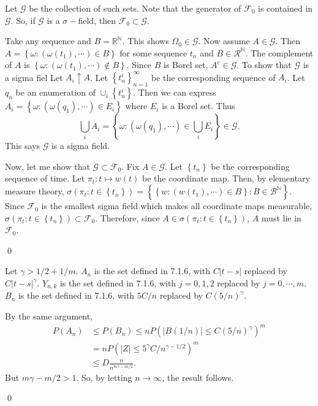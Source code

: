 \begin{problem}[7.1.4] \hfill

	Let $\mathcal{G}$ be the collection of such sets.
	Note that the generator of $\mathcal{F}_0$ is contained in $\mathcal{G}$.
	So, if $\mathcal{G}$ is a $\sigma-$field, then $\mathcal{F}_0 \subset \mathcal{G}$.
	
	Take any sequence and $B = \mathbb{R}^{\mathbb{N}}$.
	This shows $\Omega_0 \in \mathcal{G}$.
	Now assume $A \in \mathcal{G}$.
	Then $A = \left\{ \omega: (\omega(t_1), \cdots ) \in B \right\}$ for some sequence $t_n$ and $B \in \mathcal{R}^{\mathbb{N}}$.
	The complement of $A$ is $\left\{ \omega: \left( \omega(t_1), \cdots \right) \notin B \right\}$.
	Since $B$ is Borel set, $A^c \in \mathcal{G}$.
	To show that $\mathcal{G}$ is a sigma fiel
	Let $A_i \uparrow A$.
	Let $\left\{ t_n^i \right\}_{n=1}^\infty$ be the corresponding sequence of $A_i$.
	Let ${q_n}$ be an enumeration of $\cup_i \left\{ t_n^i \right\}$.
	Then we can express $A_i = \left\{ \omega: (\omega(q_1), \cdots) \in E_i \right\}$ where $E_i$ is a Borel set.
	Thus
	\[
		\bigcup_i A_i = \left\{ \omega: (\omega(q_1), \cdots) \in \bigcup_i E_i \right\} \in \mathcal{G}.
	\]
	This says $\mathcal{G}$ is a sigma field.

	Now, let me show that $\mathcal{G} \subset \mathcal{F}_0$.
	Fix $A \in \mathcal{G}$.
	Let $\left\{ t_n \right\}$ be the corresponding sequence of time.
	Let $\pi_t : t \mapsto w(t)$ be the coordinate map.
	Then, by elementary measure theory, $\sigma(\pi_t: t\in \left\{ t_n \right\}) = \left \{ \left\{ w: (w(t_1), \cdots) \in B \right\} : B \in \mathcal{B}^{\mathbb{N}} \right \}$.
Since $\mathcal{F}_0$ is the smallest sigma field which makes all coordinate maps measurable, $\sigma(\pi_t: t\in \left\{ t_n \right\} ) \subset \mathcal{F}_0$.
	Therefore, since $A \in \sigma(\pi_t: t\in \left\{ t_n \right\})$, $A$ must lie in $\mathcal{F}_0$.

	\qed
\end{problem}

\begin{problem}[7.1.5] \hfill

	Let $\gamma > 1/2 + 1/m$.
	$A_n$ is the set defined in 7.1.6, with $C|t-s|$ replaced by $C|t-s|^\gamma$.
	$Y_{n, k}$ is the set defined in 7.1.6, with $j= 0,1,2$ replaced by $j = 0, \cdots, m$.
	$B_n$ is the set defined in 7.1.6, with $5C/n$ replaced by $C (5/n)^\gamma$.

	By the same argument,
	\[
		\begin{split}
			P(A_n)
			&\le P(B_n) \le n P\left( |B(1/n)| \le C(5/n)^\gamma \right)^m \\
			&= nP\left( |Z| \le 5^\gamma C/n^{\gamma-1/2} \right)^m \\
			&\le D \frac{n}{n^{m\gamma - m/2}}.
		\end{split}
	\]
	But $m\gamma - m/2 > 1$.
	So, by letting $n \rightarrow \infty$, the result follows.

	\qed
\end{problem}

